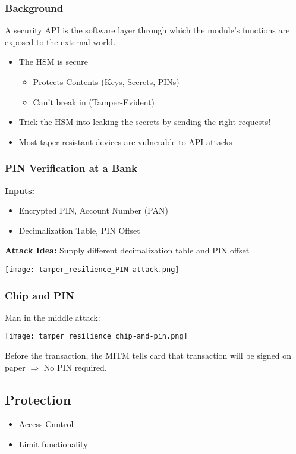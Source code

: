 \subsubsection{Background}
A security API is the software layer through which the module's functions are
exposed to the external world.
\begin{itemize}
  \item The HSM is secure
    \begin{itemize}
      \item Protects Contents (Keys, Secrets, PINs)
      \item Can’t break in (Tamper-Evident)
    \end{itemize}
  \item Trick the HSM into leaking the secrets by
    sending the right requests!
  \item Most taper resistant devices are vulnerable to API attacks
\end{itemize}

\subsubsection{PIN Verification at a Bank}
\textbf{Inputs:}

\begin{itemize}
  \item Encrypted PIN, Account Number (PAN)
  \item Decimalization Table, PIN Offset
\end{itemize}
\textbf{Attack Idea:} Supply different decimalization table and PIN offset
\begin{center}
  \texttt{[image: tamper\_resilience\_PIN-attack.png]}
\end{center}

\subsubsection{Chip and PIN}
Man in the middle attack:
\begin{center}
  \texttt{[image: tamper\_resilience\_chip-and-pin.png]}
\end{center}
Before the transaction, the MITM tells card that transaction will be signed on
paper $\Rightarrow$ No PIN required.

\subsection{Protection}
\begin{itemize}
	\item Access Cnntrol
	\item Limit functionality
\end{itemize}
